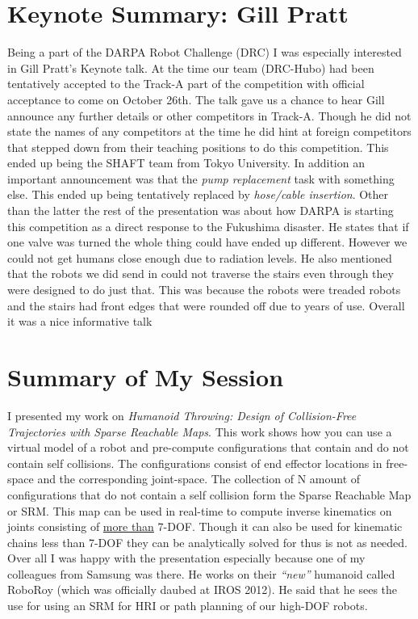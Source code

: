 \documentclass[11pt,a4paper,oneside]{report}
\begin{document}
\section*{Keynote Summary: Gill Pratt}
Being a part of the DARPA Robot Challenge (DRC) I was especially interested in Gill Pratt's Keynote talk.  
At the time our team (DRC-Hubo) had been tentatively accepted to the Track-A part of the competition with official acceptance to come on October 26th.  
The talk gave us a chance to hear Gill announce any further details or other competitors in Track-A.  
Though he did not state the names of any competitors at the time he did hint at foreign competitors that stepped down from their teaching positions to do this competition.  
This ended up being the SHAFT team from Tokyo University.  
In addition an important announcement was that the \textit{pump replacement} task with something else.  
This ended up being tentatively replaced by \textit{hose/cable insertion}.  
Other than the latter the rest of the presentation was about how DARPA is starting this competition as a direct response to the Fukushima disaster. 
He states that if one valve was turned the whole thing could have ended up different.
However we could not get humans close enough due to radiation levels.
He also mentioned that the robots we did send in could not traverse the stairs even through they were designed to do just that. 
This was because the robots were treaded robots and the stairs had front edges that were rounded off due to years of use.
Overall it was a nice informative talk

\section*{Summary of My Session}
I presented my work on \textit{Humanoid Throwing: Design of Collision-Free Trajectories with Sparse Reachable Maps}.  
This work shows how you can use a virtual model of a robot and pre-compute configurations that contain and do not contain self collisions.  
The configurations consist of end effector locations in free-space and the corresponding joint-space.  
The collection of N amount of configurations that do not contain a self collision form the Sparse Reachable Map or SRM.  
This map can be used in real-time to compute inverse kinematics on joints consisting of \underline{more than} 7-DOF.  
Though it can also be used for kinematic chains less than 7-DOF they can be analytically solved for thus is not as needed.
Over all I was happy with the presentation especially because one of my colleagues from Samsung was there.
He works on their \textit{``new''} humanoid called RoboRoy (which was officially daubed at IROS 2012).
He said that he sees the use for using an SRM for HRI or path planning of our high-DOF robots.
\end{document}

